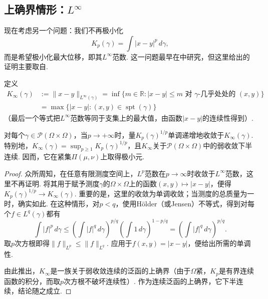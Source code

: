 \subsection[上确界情形]{上确界情形：$L^\infty$}\label{sec:3.2}
现在考虑另一个问题：我们不再极小化
\[
K_p(\gamma)=\int|x-y|^p\,d\gamma,
\]
而是希望极小化最大位移，即其$L^\infty$范数. 这一问题最早在\cite{b122}中研究，但这里给出的证明主要取自\cite{b197}.

定义
\begin{equation*}
\begin{aligned}
K_\infty(\gamma)&:=\|x-y\|_{L^\infty(\gamma)}
=\inf\{m\in\mathbb R:|x-y|\le m\text{ 对 }\gamma\text{-几乎处处的 }(x,y)\}\\
&=\max\{|x-y|:(x,y)\in\operatorname{spt}(\gamma)\}
\end{aligned}
\end{equation*}
（最后一个等式把$L^\infty$范数等同于支集上的最大值，由函数$|x-y|$的连续性得到）.

\begin{lemma}\label{obj:3.21}
对每个$\gamma\in\mathscr P(\Omega\times\Omega)$，当$p\to+\infty$时，量$K_p(\gamma)^{1/p}$单调递增地收敛于$K_\infty(\gamma)$. 特别地，$K_\infty(\gamma)=\sup_{p\ge1}K_p(\gamma)^{1/p}$，且$K_\infty$关于$\mathscr P(\Omega\times\Omega)$中的弱收敛下半连续. 因而，它在紧集$\Pi(\mu,\nu)$上取得极小元.
\end{lemma}
\begin{proof}
众所周知，在任意有限测度空间上，$L^p$范数在$p\to\infty$时收敛于$L^\infty$范数，这里不再证明. 将其用于赋予测度$\gamma$的$\Omega\times\Omega$上的函数$(x,y)\mapsto|x-y|$，便得$K_p(\gamma)^{1/p}\to K_\infty(\gamma)$. 重要的是，这里的收敛为单调收敛；当测度的总质量为一时，确实如此. 在这种情形，对$p<q$，使用Hölder（或Jensen）不等式，得到对每个$f\in L^q(\gamma)$都有
\[
\int|f|^p\,d\gamma\le
\left(\int|f|^q\,d\gamma\right)^{p/q}
\left(\int1\,d\gamma\right)^{1-p/q}
=\left(\int|f|^q\,d\gamma\right)^{p/q}.
\]
取$p$次方根即得$\|f\|_{L^p}\le\|f\|_{L^q}$. 应用于$f(x,y)=|x-y|$，便给出所需的单调性.

由此推出，$K_\infty$是一族关于弱收敛连续的泛函的上确界（由于$\Omega$紧，$K_p$是有界连续函数的积分，而取$p$次方根不破坏连续性）. 作为连续泛函的上确界，它下半连续，结论随之成立.
\end{proof}

